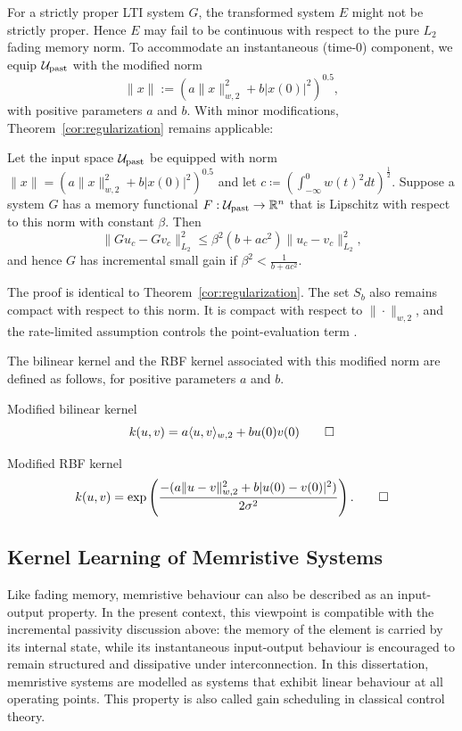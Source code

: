 For a strictly proper LTI system $G$, the transformed system $E$ might not be strictly proper. Hence $E$ may fail to be continuous with respect to the pure $L_2$ fading memory norm. To accommodate an instantaneous (time-$0$) component, we equip ${\cal U}_\text{past}$ with the modified norm
$$
\|x\|:=\left(a\|x\|_{w,2}^2 + b|x(0)|^2\right)^{0.5},
$$
with positive parameters $a$ and $b$. With minor modifications, Theorem~\ref{cor:regularization} remains applicable:
\begin{corollary}
Let the input space ${\cal U}_\text{past}$ be equipped with norm $\|x\|=\left(a\|x\|_{w,2}^2 + b|x(0)|^2\right)^{0.5}$ and let $c \coloneqq \left(\int_{-\infty}^{0}w(t)^2dt\right)^{\frac{1}{2}}$. Suppose a system $G$ has a memory functional $F:{\cal U}_\text{past}\to \mathbb{R}^n$ that is Lipschitz with respect to this norm with constant $\beta$. Then
$$
\|Gu_c-Gv_c\|_{L_2}^2\le\beta^2(b+ac^2)\|u_c-v_c\|_{L_2}^2,
$$
and hence $G$ has incremental small gain if $\beta^2<\frac{1}{b+ac^2}$.
\end{corollary}
The proof is identical to Theorem~\ref{cor:regularization}. The set $S_b$ also remains compact with respect to this norm. It is compact with respect to $\|\cdot\|_{w,2}$, and the rate-limited assumption controls the point-evaluation term \autocite{boyd_fading_1985}.

The bilinear kernel and the RBF kernel associated with this modified norm are defined as follows, for positive parameters $a$ and $b$.
\begin{definition}{Modified bilinear kernel}
    $$k(u,v)=a\langle u,v\rangle_{w,2} + b u(0)v(0) \qedhere$$
\end{definition}
\begin{definition}{Modified RBF kernel}
    $$k(u,v)=\exp\left(\frac{-(a\|u-v\|_{w,2}^2 + b|u(0)-v(0)|^2)}{2\sigma^2}\right). \qedhere$$
\end{definition}

\subsection{Kernel Learning of Memristive Systems}

Like fading memory, memristive behaviour can also be described as an input-output property. In the present context, this viewpoint is compatible with the incremental passivity discussion above: the memory of the element is carried by its internal state, while its instantaneous input-output behaviour is encouraged to remain structured and dissipative under interconnection. In this dissertation, memristive systems are modelled as systems that exhibit linear behaviour at all operating points. This property is also called gain scheduling in classical control theory.


